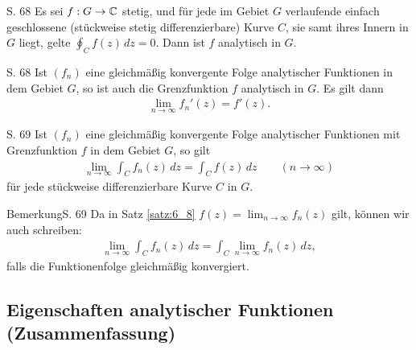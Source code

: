 \begin{lemma}{S. 68}
  Es sei $f: G \to \mathbb{C}$ stetig, und für jede im Gebiet $G$ verlaufende einfach geschlossene (stückweise stetig differenzierbare) Kurve $C$, sie samt ihres Innern in $G$ liegt, gelte $\oint_C f(z) \, dz = 0$.
  Dann ist $f$ analytisch in $G$.
\end{lemma}

\begin{satz}[Weierstraß]{S. 68}
  \label{satz:6_7}
  Ist $(f_n)$ eine gleichmäßig konvergente Folge analytischer Funktionen in dem Gebiet $G$, so ist auch die Grenzfunktion $f$ analytisch in $G$.
  Es gilt dann
  \begin{align}
    \lim_{n \to \infty} f_n'(z) = f'(z) .
  \end{align}
\end{satz}

\begin{satz}{S. 69}
  \label{satz:6_8}
  Ist $(f_n)$ eine gleichmäßig konvergente Folge analytischer Funktionen mit Grenzfunktion $f$ in dem Gebiet $G$, so gilt
  \begin{align}
    \lim_{n \to \infty} \int_C f_n(z) \, dz = \int_C f(z) \, dz \qquad (n \to \infty)
  \end{align}
  für jede stückweise differenzierbare Kurve $C$ in $G$.
\end{satz}

\begin{bemerkung}{Bemerkung}{S. 69}
  Da in Satz \ref{satz:6_8} $f(z) = \lim_{n \to \infty} f_n(z)$ gilt, können wir auch schreiben:
  \begin{align}
    \lim_{n \to \infty} \int_C f_n(z) \, dz = \int_C \lim_{n \to \infty} f_n(z) \, dz ,
  \end{align}
  falls die Funktionenfolge gleichmäßig konvergiert.
\end{bemerkung}



\subsection{Eigenschaften analytischer Funktionen (Zusammenfassung)}

